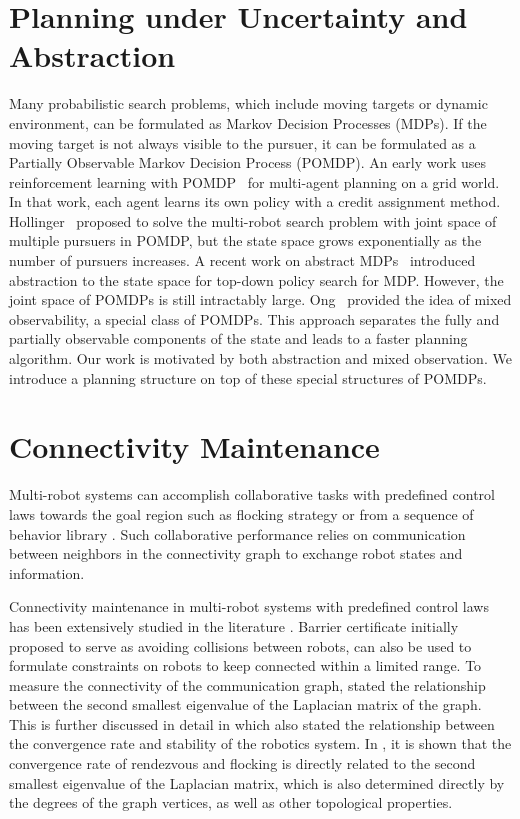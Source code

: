 \documentclass[../main.tex]{subfiles}
\begin{document}
\section{Planning under Uncertainty and Abstraction}
Many probabilistic search problems, which include moving targets or dynamic environment, can be formulated as Markov Decision Processes (MDPs). If the moving target is not always visible to the pursuer, it can be formulated as a Partially Observable Markov Decision Process (POMDP). An early work uses reinforcement learning with POMDP~\cite{arai2000experience} for multi-agent planning on a grid world. In that work, each agent learns its own policy with a credit assignment method. Hollinger~\cite{hollinger2009efficient} proposed to solve the multi-robot search problem with joint space of multiple pursuers in POMDP, but the state space grows exponentially as the number of pursuers increases. A recent work on abstract MDPs~\cite{gopalan2017planning} introduced abstraction to the state space for top-down policy search for MDP. However, the joint space of POMDPs is still intractably large.
Ong~\cite{ong2010planning} provided the idea of mixed observability, a special class of POMDPs. This approach separates the fully and partially observable components of the state and leads to a faster planning algorithm. Our work is motivated by
both abstraction and mixed observation. We introduce a planning structure on top of these special structures of POMDPs.

\section{Connectivity Maintenance}
Multi-robot systems can accomplish collaborative tasks with predefined control laws towards the goal region such as flocking strategy \cite{olfati2006flocking,zavlanos2007flocking} or from a sequence of behavior library \cite{nagavalli2017automated}. Such collaborative performance relies on communication between neighbors in the connectivity graph \cite{zavlanos2008distributed} to exchange robot states and information.

Connectivity maintenance in multi-robot systems with predefined control laws has been extensively studied in the literature \cite{michael2009maintaining, zavlanos2008distributed, sabattini2013distributed}. Barrier certificate \cite{borrmann2015control} initially proposed to serve as avoiding collisions between robots, can also be used to formulate constraints on robots to keep connected within a limited range. To measure the connectivity of the communication graph, \cite{fiedler1973algebraic} stated the relationship between the second smallest eigenvalue of the Laplacian matrix of the graph. This is further discussed in detail in \cite{olfati2007consensus} which also stated the relationship between the convergence rate and stability of the robotics system. In \cite{olfati2007consensus, olfati2006flocking}, it is shown that the convergence rate of rendezvous and flocking is directly related to the second smallest eigenvalue of the Laplacian matrix, which is also determined directly by the degrees of the graph vertices, as well as other topological properties. 
\end{document}
